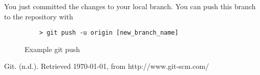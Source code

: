 \documentclass[11pt]{report}
\begin{document}
You just committed the changes to your local branch.  You can push
this branch to the repository with

\begin{figure}[H]
  \caption{Example git push}
  \begin{lstlisting}
    > git push -u origin [new_branch_name]
  \end{lstlisting}
\end{figure}

\begin{thebibliography}{9}

    Git. (n.d.). Retrieved \today, from http://www.git-scm.com/

\end{thebibliography}
\end{document}
